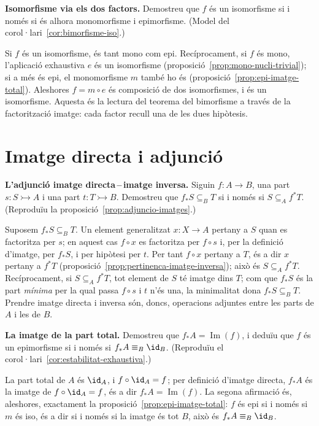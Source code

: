 \begin{exercici}
\textbf{Isomorfisme via els dos factors.} Demostreu que \(f\) és un isomorfisme si i només si és alhora monomorfisme i epimorfisme. (Model del corol·lari~\ref{cor:bimorfisme-iso}.)
\end{exercici}
\begin{solucio}
Si \(f\) és un isomorfisme, és tant mono com epi. Recíprocament, si \(f\) és mono, l'aplicació exhaustiva \(e\) és un isomorfisme (proposició~\ref{prop:mono-nucli-trivial}); si a més és epi, el monomorfisme \(m\) també ho és (proposició~\ref{prop:epi-imatge-total}). Aleshores \(f=m\circ e\) és composició de dos isomorfismes, i és un isomorfisme. Aquesta és la lectura del teorema del bimorfisme a través de la factorització imatge: cada factor recull una de les dues hipòtesis.
\end{solucio}

\section{Imatge directa i adjunció}\label{prac:imatge-directa}

\begin{exercici}
\textbf{L'adjunció imatge directa\,--\,imatge inversa.} Siguin \(f\colon A\to B\), una part \(s\colon S\rightarrowtail A\) i una part \(t\colon T\rightarrowtail B\). Demostreu que \(f_{*}S\subseteq_B T\) si i només si \(S\subseteq_A f^{*}T\). (Reproduïu la proposició~\ref{prop:adjuncio-imatges}.)
\end{exercici}
\begin{solucio}
Suposem \(f_{*}S\subseteq_B T\). Un element generalitzat \(x\colon X\to A\) pertany a \(S\) quan es factoritza per \(s\); en aquest cas \(f\circ x\) es factoritza per \(f\circ s\) i, per la definició d'imatge, per \(f_{*}S\), i per hipòtesi per \(t\). Per tant \(f\circ x\) pertany a \(T\), és a dir \(x\) pertany a \(f^{*}T\) (proposició~\ref{prop:pertinenca-imatge-inversa}); això és \(S\subseteq_A f^{*}T\). Recíprocament, si \(S\subseteq_A f^{*}T\), tot element de \(S\) té imatge dins \(T\); com que \(f_{*}S\) és la part \emph{mínima} per la qual passa \(f\circ s\) i \(t\) n'és una, la minimalitat dona \(f_{*}S\subseteq_B T\). Prendre imatge directa i inversa són, doncs, operacions adjuntes entre les parts de \(A\) i les de \(B\).
\end{solucio}

\begin{exercici}
\textbf{La imatge de la part total.} Demostreu que \(f_{*}A=\operatorname{Im}(f)\), i deduïu que \(f\) és un epimorfisme si i només si \(f_{*}A\equiv_B\id_B\). (Reproduïu el corol·lari~\ref{cor:estabilitat-exhaustiva}.)
\end{exercici}
\begin{solucio}
La part total de \(A\) és \(\id_A\), i \(f\circ\id_A=f\); per definició d'imatge directa, \(f_{*}A\) és la imatge de \(f\circ\id_A=f\), és a dir \(f_{*}A=\operatorname{Im}(f)\). La segona afirmació és, aleshores, exactament la proposició~\ref{prop:epi-imatge-total}: \(f\) és epi si i només si \(m\) és iso, és a dir si i només si la imatge és tot \(B\), això és \(f_{*}A\equiv_B\id_B\).
\end{solucio}

